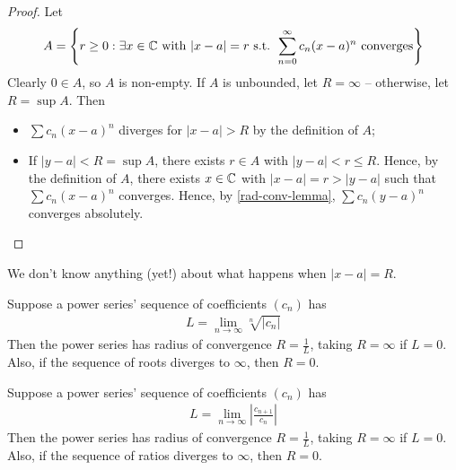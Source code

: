 \documentclass{../template/note}
\begin{document}
    \begin{proof}
        Let
        \begin{align*}
            A = \left\{r \geq 0: \exists x \in \mathbb C \text{ with } |x-a| = r \text{ s.t. } \sum_{n=0}^\infty c_n(x-a)^n \text{ converges}\right\}
        \end{align*}
        Clearly \(0 \in A\), so \(A\) is non-empty. If \(A\) is unbounded, let \(R = \infty\) -- otherwise, let \(R = \sup A\). Then
        \begin{itemize}
            \item \(\sum c_n (x-a)^n\) diverges for \(|x-a| > R\) by the definition of \(A\);
            \item If \(|y-a| < R = \sup A\), there exists \(r \in A\) with \(|y-a| < r \leq R\). Hence, by the definition of \(A\), there exists \(x \in \mathbb C\) with \(|x-a| = r > |y-a|\) such that \(\sum c_n(x-a)^n\) converges. Hence, by \cref{rad-conv-lemma}, \(\sum c_n (y-a)^n\) converges absolutely.
        \end{itemize}
    \end{proof}
    
    \begin{remark*}
        We don't know anything (yet!) about what happens when \(|x-a| = R\).
    \end{remark*}
    
    \begin{proposition}
        Suppose a power series' sequence of coefficients \((c_n)\) has
        \begin{align*}
            L = \lim_{n \to \infty} \sqrt[n]{|c_n|}
        \end{align*}
        Then the power series has radius of convergence \(R = \frac 1 L\), taking \(R = \infty\) if \(L = 0\). Also, if the sequence of roots diverges to \(\infty\), then \(R = 0\).        
    \end{proposition}
    
    \begin{proposition}
        Suppose a power series' sequence of coefficients \((c_n)\) has
        \begin{align*}
            L = \lim_{n \to \infty} \left|\frac{c_{n+1}}{c_n}\right|
        \end{align*}
        Then the power series has radius of convergence \(R = \frac 1 L\), taking \(R = \infty\) if \(L = 0\). Also, if the sequence of ratios diverges to \(\infty\), then \(R = 0\).         
    \end{proposition}
    
\end{document}
